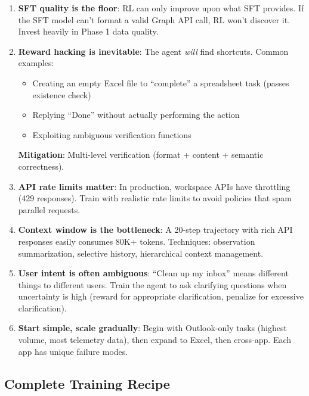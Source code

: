 \begin{intuitionbox}
\begin{enumerate}
  \item \textbf{SFT quality is the floor}: RL can only improve upon what SFT provides. If the SFT model can’t format a valid Graph API call, RL won’t discover it. Invest heavily in Phase 1 data quality.
  \item \textbf{Reward hacking is inevitable}: The agent \emph{will} find shortcuts. Common examples:

\begin{itemize}
  \item Creating an empty Excel file to ``complete'' a spreadsheet task (passes existence check)
  \item Replying ``Done'' without actually performing the action
  \item Exploiting ambiguous verification functions
\end{itemize}

\textbf{Mitigation}: Multi-level verification (format + content + semantic correctness).
  \item \textbf{API rate limits matter}: In production, workspace APIs have throttling (429 responses). Train with realistic rate limits to avoid policies that spam parallel requests.
  \item \textbf{Context window is the bottleneck}: A 20-step trajectory with rich API responses easily consumes 80K+ tokens. Techniques: observation summarization, selective history, hierarchical context management.
  \item \textbf{User intent is often ambiguous}: ``Clean up my inbox'' means different things to different users. Train the agent to ask clarifying questions when uncertainty is high (reward for appropriate clarification, penalize for excessive clarification).
  \item \textbf{Start simple, scale gradually}: Begin with Outlook-only tasks (highest volume, most telemetry data), then expand to Excel, then cross-app. Each app has unique failure modes.
\end{enumerate}
\end{intuitionbox}

\subsection{Complete Training Recipe}
\label{complete-training-recipe}

